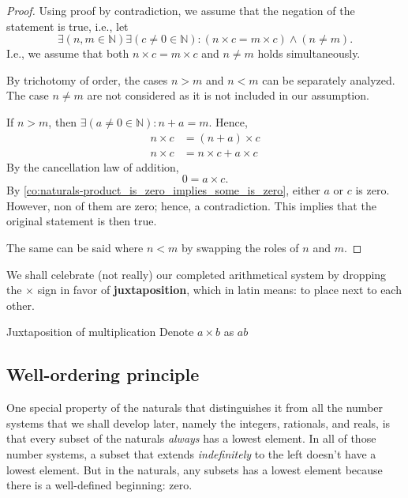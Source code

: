 \begin{proof}
  Using proof by contradiction, we assume that the negation of the statement is true, i.e., let
  \begin{equation}
    \exists (n, m \in \mathbb{N}) \exists (c \neq 0 \in \mathbb{N}) : (n \times c = m \times c)
    \land (n \neq m).
  \end{equation}
  I.e., we assume that both \(n \times c = m \times c\) and \(n \neq m\) holds simultaneously.

  By trichotomy of order, the cases \(n > m\) and \(n < m\) can be separately analyzed. The case
  \(n \neq m\) are not considered as it is not included in our assumption.

  If \(n > m\), then \(\exists (a \neq 0 \in \mathbb{N}) : n + a = m\). Hence,
  \begin{align}
    n \times c & = (n + a) \times c        \\
    n \times c & = n \times c + a \times c
  \end{align}
  By the cancellation law of addition,
  \begin{equation}
    0 = a \times c.
  \end{equation}
  By \cref{co:naturals-product_is_zero_implies_some_is_zero}, either \(a\) or \(c\) is zero.
  However, non of them are zero; hence, a contradiction. This implies that the original statement is
  then true.

  The same can be said where \(n < m\) by swapping the roles of \(n\) and \(m\).
\end{proof}

We shall celebrate (not really) our completed arithmetical system by dropping the \(\times\) sign in
favor of \textbf{juxtaposition}, which in latin means: to place next to each other.

\begin{notation}{Juxtaposition of multiplication}{}
  Denote \(a \times b\) as \(ab\)
\end{notation}

\subsection{Well-ordering principle}

One special property of the naturals that distinguishes it from all the number systems that we shall
develop later, namely the integers, rationals, and reals, is that every subset of the naturals
\emph{always} has a lowest element. In all of those number systems, a subset that extends
\emph{indefinitely} to the left doesn't have a lowest element. But in the naturals, any subsets has
a lowest element because there is a well-defined beginning: zero.

